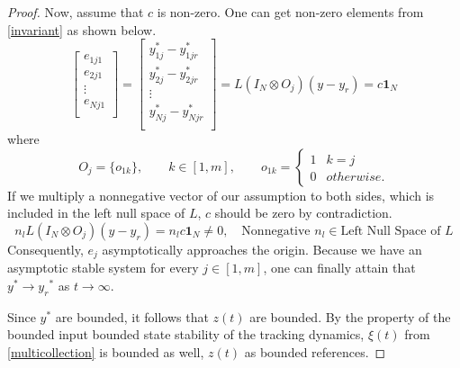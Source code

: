 \documentclass[11pt, a4paper, oneside, openany, reqno]{book}
\theoremstyle{definition}
\theoremstyle{remark}
\numberwithin{equation}{chapter} %
\newcommand{\ONE}{\textbf{1}}
\begin{document}
\begin{proof}
	Now, assume that $ c $ is non-zero. 
	One can get non-zero elements from \eqref{invariant} as shown below.
	\begin{equation}
	\left[ \begin{array}{c}	e_{1j1} \\	e_{2j1} \\	\vdots  \\	e_{Nj1} \\	\end{array} \right] = 
	\left[ \begin{array}{c}	y_{1j}^* - y_{1jr}^* \\	y_{2j}^* - y_{2jr}^* \\	
		\vdots  \\	y_{Nj}^* - y_{Njr}^* \\	\end{array} \right] 
	= L (I_N \otimes O_j) (y-y_{r}) = c \ONE_N 
	\end{equation}
	where
	\begin{equation}
		O_j = \lbrace o_{1k} \rbrace,
		\qquad k \in \left[1,m\right],
		\qquad o_{1k} = \begin{cases} 1 & k=j \\ 0 & otherwise. \end{cases}		
	\end{equation}
	If we multiply a nonnegative vector of our assumption to both sides, 
	which is included in the left null space of $ L $,
	$ c $ should be zero by contradiction.
	\begin{equation}
	n_l L (I_N \otimes O_j)(y-y_r) = n_l c \ONE_N \neq 0, 
	\quad \text{Nonnegative } n_l \in \text{Left Null Space of }L
	\end{equation}
	Consequently, $ e_j $ asymptotically approaches the origin.
	Because we have an asymptotic stable system for every $ j \in \left[ 1, m\right] $,
	one can finally attain that $ y^* \to {y_{r}}^* $ as $ t \to \infty $.

	Since $ y^* $ are bounded, it follows that $ z(t) $ are bounded.
	By the property of the bounded input bounded state stability of the tracking dynamics, 
	$ \xi (t)  $ from \eqref{multicollection} is bounded as well, $ z(t) $
	as bounded references.
\end{proof}
	
\end{document}
